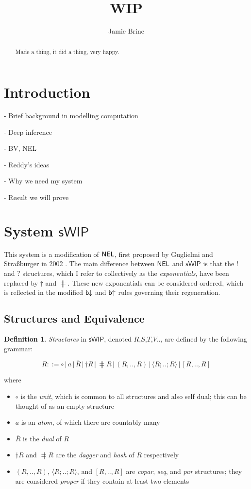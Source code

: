 \documentclass[12pt, oneside]{article}
\title{WIP}
\author{Jamie Brine}
\theoremstyle{plain}
\theoremstyle{definition}
\newtheorem{definition}[theorem]{Definition}
\let\originaldagger\dagger
\renewcommand{\dag}{\mathord{\originaldagger}}
\newcommand{\la}{\langle}
\newcommand{\ra}{\rangle}
\newcommand{\sSys}{{\mathsf{sWIP}}}%
\newcommand{\unit}{\circ}
\begin{document}
\maketitle

\begin{abstract}
    Made a thing, it did a thing, very happy.
\end{abstract}

\newpage
\tableofcontents

\newpage
\section{Introduction}

- Brief background in modelling computation

- Deep inference

- BV, NEL

- Reddy's ideas

- Why we need my system

- Result we will prove

\newpage
\section{System $\sSys$}

This system is a modification of ${\mathsf{NEL}}$, first proposed by Guglielmi and Straßburger in 2002 \cite{guglielmi2002non}.
The main difference between ${\mathsf{NEL}}$ and $\sSys$ is that the $!$ and $?$ structures, which I refer to collectively as the \textit{exponentials}, have been replaced by $\dag$ and $\hash$.
These new exponentials can be considered ordered, which is reflected in the modified ${\mathsf b}{\downarrow}$ and ${\mathsf b}{ \uparrow}$ rules governing their regeneration.

\subsection{Structures and Equivalence}

\begin{definition}
\textit{Structures} in $\sSys$, denoted $R$,$S$,$T$,$V$.., are defined by the following grammar:

\[R ::= \unit \,|\, a \,|\, \overline{R} \,|\, \dag R \,|\, \hash R \,|\, (R,..,R) \,|\, \la R;..;R\ra \,|\, [R,..,R]\]

where
\begin{itemize}
\item $\unit$ is the \textit{unit}, which is common to all structures and also self dual; this can be thought of as an empty structure
\item $a$ is an \textit{atom}, of which there are countably many
\item $\overline{R}$ is the \textit{dual} of $R$
\item $\dag R$ and $\hash R$ are the \textit{dagger} and \textit{hash} of $R$ respectively
\item $(R,..,R)$, $\la R;..;R\ra$, and $[R,..,R]$ are \textit{copar}, \textit{seq}, and \textit{par} structures; they are considered \textit{proper} if they contain at least two elements
\end{itemize}
\end{definition}
\end{document}
